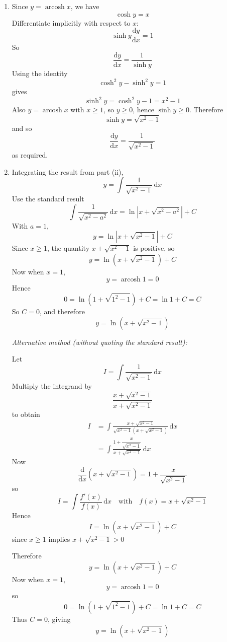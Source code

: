 \documentclass[leqno]{article}
\begin{document}
\begin{enumerate}[
  label=\textbf{\arabic*.},
  leftmargin=*,
  topsep=0pt,
  partopsep=0pt,
  parsep=0pt
]
\begin{tcolorbox}[colback=white, colframe=scarlet, title={\textbf{Solution}}, breakable, grow to left by=6mm, grow to right by=10mm]
\begin{enumerate}[label=\textbf{(\roman*)}]
\item Since \(y=\operatorname{arcosh}x\), we have
\[
\cosh y=x
\]
Differentiate implicitly with respect to \(x\):
\[
\sinh y\frac{\mathrm{d}y}{\mathrm{d}x}=1
\]
So
\[
\frac{\mathrm{d}y}{\mathrm{d}x}=\frac{1}{\sinh y}
\]
Using the identity
\[
\cosh^2 y-\sinh^2 y=1
\]
gives
\[
\sinh^2 y=\cosh^2 y-1=x^2-1
\]
Also \(y=\operatorname{arcosh}x\) with \(x\ge 1\), so \(y\ge 0\), hence \(\sinh y\ge 0\). Therefore
\[
\sinh y=\sqrt{x^2-1}
\]
and so
\[
\frac{\mathrm{d}y}{\mathrm{d}x}=\frac{1}{\sqrt{x^2-1}}
\]
as required.

\item Integrating the result from part (ii),
\[
y=\int \frac{1}{\sqrt{x^2-1}}\,\mathrm{d}x
\]
Use the standard result
\[
\int \frac{1}{\sqrt{x^2-a^2}}\,\mathrm{d}x=\ln\left|x+\sqrt{x^2-a^2}\right|+C
\]
With \(a=1\),
\[
y=\ln\left|x+\sqrt{x^2-1}\right|+C
\]
Since \(x\ge 1\), the quantity \(x+\sqrt{x^2-1}\) is positive, so
\[
y=\ln\left(x+\sqrt{x^2-1}\right)+C
\]
Now when \(x=1\),
\[
y=\operatorname{arcosh}1=0
\]
Hence
\[
0=\ln\left(1+\sqrt{1^2-1}\right)+C=\ln 1+C=C
\]
So \(C=0\), and therefore
\[
y=\ln\left(x+\sqrt{x^2-1}\right)
\]

\medskip

\emph{Alternative method (without quoting the standard result):}

Let
\[
I=\int \frac{1}{\sqrt{x^2-1}}\,\mathrm{d}x
\]
Multiply the integrand by
\[
\frac{x+\sqrt{x^2-1}}{x+\sqrt{x^2-1}}
\]
to obtain
\begin{align*}
I
&=\int \frac{x+\sqrt{x^2-1}}{\sqrt{x^2-1}\left(x+\sqrt{x^2-1}\right)}\,\mathrm{d}x \\[4pt]
&=\int \frac{1+\dfrac{x}{\sqrt{x^2-1}}}{x+\sqrt{x^2-1}}\,\mathrm{d}x
\end{align*}
Now
\[
\frac{\mathrm{d}}{\mathrm{d}x}\!\left(x+\sqrt{x^2-1}\right)
=1+\frac{x}{\sqrt{x^2-1}}
\]
so
\[
I=\int \frac{f'(x)}{f(x)}\,\mathrm{d}x
\quad\text{with}\quad
f(x)=x+\sqrt{x^2-1}
\]
Hence
\[
I=\ln\left(x+\sqrt{x^2-1}\right)+C
\]
since \(x\ge 1\) implies \(x+\sqrt{x^2-1}>0\)

Therefore
\[
y=\ln\left(x+\sqrt{x^2-1}\right)+C
\]
Now when \(x=1\),
\[
y=\operatorname{arcosh}1=0
\]
so
\[
0=\ln\left(1+\sqrt{1^2-1}\right)+C=\ln 1+C=C
\]
Thus \(C=0\), giving
\[
y=\ln\left(x+\sqrt{x^2-1}\right)
\] \\


\end{enumerate}
\end{tcolorbox}
\end{enumerate}
\end{document}

